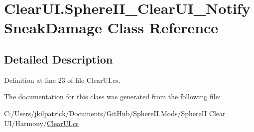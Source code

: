 \hypertarget{class_clear_u_i_1_1_sphere_i_i___clear_u_i___notify_sneak_damage}{}\section{Clear\+U\+I.\+Sphere\+I\+I\+\_\+\+Clear\+U\+I\+\_\+\+Notify\+Sneak\+Damage Class Reference}
\label{class_clear_u_i_1_1_sphere_i_i___clear_u_i___notify_sneak_damage}


\subsection{Detailed Description}


Definition at line 23 of file Clear\+U\+I.\+cs.



The documentation for this class was generated from the following file\+:\begin{DoxyCompactItemize}
\item 
C\+:/\+Users/jkilpatrick/\+Documents/\+Git\+Hub/\+Sphere\+I\+I.\+Mods/\+Sphere\+I\+I Clear U\+I/\+Harmony/\mbox{\hyperlink{_clear_u_i_8cs}{Clear\+U\+I.\+cs}}\end{DoxyCompactItemize}
